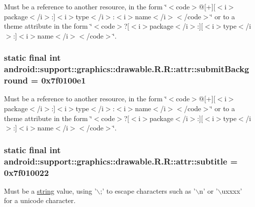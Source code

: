 Must be a reference to another resource, in the form \char`\"{}$<$code$>$@\mbox{[}+\mbox{]}\mbox{[}$<$i$>$package$<$/i$>$:\mbox{]}$<$i$>$type$<$/i$>$:$<$i$>$name$<$/i$>$$<$/code$>$\char`\"{} or to a theme attribute in the form \char`\"{}$<$code$>$?\mbox{[}$<$i$>$package$<$/i$>$:\mbox{]}\mbox{[}$<$i$>$type$<$/i$>$:\mbox{]}$<$i$>$name$<$/i$>$$<$/code$>$\char`\"{}. \hypertarget{classandroid_1_1support_1_1graphics_1_1drawable_1_1_r_1_1attr_bdfe6979de1efa6ee80fc315f77661cc}{
\subsubsection[{submitBackground}]{\setlength{\rightskip}{0pt plus 5cm}static final int android::support::graphics::drawable.R.R::attr::submitBackground = 0x7f0100e1}}
\label{classandroid_1_1support_1_1graphics_1_1drawable_1_1_r_1_1attr_bdfe6979de1efa6ee80fc315f77661cc}


Must be a reference to another resource, in the form \char`\"{}$<$code$>$@\mbox{[}+\mbox{]}\mbox{[}$<$i$>$package$<$/i$>$:\mbox{]}$<$i$>$type$<$/i$>$:$<$i$>$name$<$/i$>$$<$/code$>$\char`\"{} or to a theme attribute in the form \char`\"{}$<$code$>$?\mbox{[}$<$i$>$package$<$/i$>$:\mbox{]}\mbox{[}$<$i$>$type$<$/i$>$:\mbox{]}$<$i$>$name$<$/i$>$$<$/code$>$\char`\"{}. \hypertarget{classandroid_1_1support_1_1graphics_1_1drawable_1_1_r_1_1attr_621cd07e36a07d14d2e202b0f8b9e0d5}{
\subsubsection[{subtitle}]{\setlength{\rightskip}{0pt plus 5cm}static final int android::support::graphics::drawable.R.R::attr::subtitle = 0x7f010022}}
\label{classandroid_1_1support_1_1graphics_1_1drawable_1_1_r_1_1attr_621cd07e36a07d14d2e202b0f8b9e0d5}


Must be a \hyperlink{classandroid_1_1support_1_1graphics_1_1drawable_1_1_r_1_1string}{string} value, using '$\backslash$;' to escape characters such as '$\backslash$n' or '$\backslash$uxxxx' for a unicode character. 

